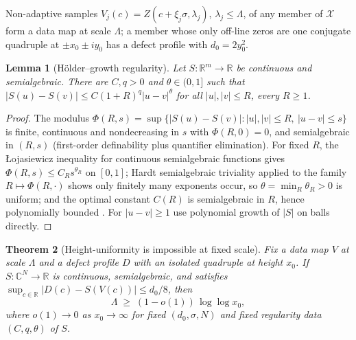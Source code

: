 \documentclass[11pt]{amsart}
\theoremstyle{plain}
\newtheorem{theorem}{Theorem}[section]
\newtheorem{lemma}[theorem]{Lemma}
\theoremstyle{definition}
\theoremstyle{remark}
\newcommand{\CC}{\mathbb{C}}
\newcommand{\RR}{\mathbb{R}}
\begin{document}
Non-adaptive samples $V_j(c)=Z(c+\xi_j\sigma,\lambda_j)$, $\lambda_j\le\Lambda$, of any member of
$\mathcal X$ form a data map at scale $\Lambda$; a member whose only off-line zeros are one
conjugate quadruple at $\pm x_0\pm iy_0$ has a defect profile with $d_0=2y_0^2$.

\begin{lemma}[H\"older--growth regularity]\label{lem:holder}
Let $S:\RR^m\to\RR$ be continuous and semialgebraic. There are $C,q>0$ and $\theta\in(0,1]$ such
that $|S(u)-S(v)|\le C(1+R)^q|u-v|^\theta$ for all $|u|,|v|\le R$, every $R\ge1$.
\end{lemma}

\begin{proof}
The modulus $\Phi(R,s)=\sup\{|S(u)-S(v)|:|u|,|v|\le R,\ |u-v|\le s\}$ is finite, continuous and
nondecreasing in $s$ with $\Phi(R,0)=0$, and semialgebraic in $(R,s)$ (first-order definability
plus quantifier elimination). For fixed $R$, the \L ojasiewicz inequality for continuous
semialgebraic functions \cite[Prop.~2.6.4]{BCR} gives $\Phi(R,s)\le C_Rs^{\theta_R}$ on $[0,1]$;
Hardt semialgebraic triviality \cite[Thm.~9.3.2]{BCR} applied to the family $R\mapsto\Phi(R,\cdot)$
shows only finitely many exponents occur, so $\theta=\min_R\theta_R>0$ is uniform; and the optimal
constant $C(R)$ is semialgebraic in $R$, hence polynomially bounded \cite[Prop.~2.6.2]{BCR}. For
$|u-v|\ge1$ use polynomial growth of $|S|$ on balls directly.
\end{proof}

\begin{theorem}[Height-uniformity is impossible at fixed scale]\label{thm:lower}
Fix a data map $V$ at scale $\Lambda$ and a defect profile $D$ with an isolated quadruple at
height $x_0$. If $S:\CC^N\to\RR$ is continuous, semialgebraic, and satisfies
$\sup_{c\in\RR}|D(c)-S(V(c))|\le d_0/8$, then
\[
\Lambda\;\ge\;(1-o(1))\,\log\log x_0 ,
\]
where $o(1)\to0$ as $x_0\to\infty$ for fixed $(d_0,\sigma,N)$ and fixed regularity data
$(C,q,\theta)$ of $S$.
\end{theorem}
\end{document}
